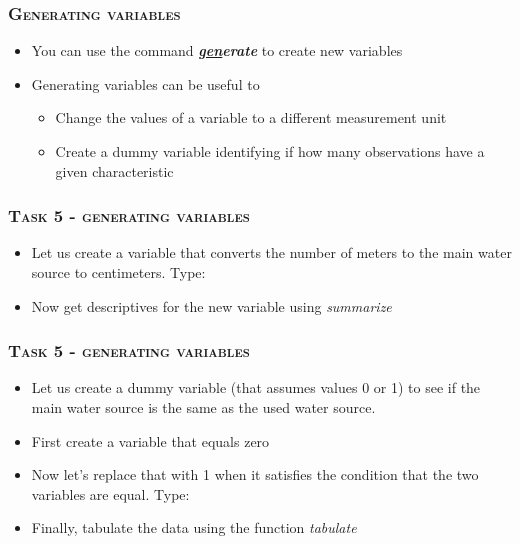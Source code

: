 \documentclass[10pt]{beamer}
\begin{document}
	\begin{frame}
		\frametitle{\textsc{Generating variables}}
		\begin{itemize}
			\item You can use the command \textbf{\textit{\underline{gen}erate}} to create new variables		
			\item Generating variables can be useful to
			\begin{itemize}
				\item Change the values of a variable to a different measurement unit
				\item Create a dummy variable identifying if how many observations have a given characteristic
			\end{itemize}
		\end{itemize}		
	\end{frame}		
	
	
	\begin{frame}
		\frametitle{\textsc{Task 5 - generating variables}}
		\begin{itemize} 
			\item Let us create a variable that converts the number of meters to the main water source to centimeters. Type:
		\end{itemize}
\begin{stlog}\end{stlog}
		\begin{itemize}
			\item Now get descriptives for the new variable using \textit{summarize}
		\end{itemize}
	\end{frame}
	
	
	\begin{frame}
		\frametitle{\textsc{Task 5 - generating variables}}
		\begin{itemize} 
			\item Let us create a dummy variable (that assumes values 0 or 1) to see if the main water source is the same as the used water source. 
		\onslide<2->	\item First create a variable that equals zero
		\end{itemize}
\begin{stlog}\end{stlog}
		\begin{itemize}
			\item Now let's replace that with 1 when it satisfies the condition that the two variables are equal. Type:
		\end{itemize}
\begin{stlog}\end{stlog}
		\begin{itemize}
			\item Finally, tabulate the data using the function \textit{tabulate}
		\end{itemize}		
	\end{frame}
	
\end{document}
